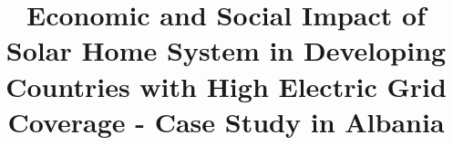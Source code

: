 \documentclass[11pt,oneside,table]{book}
\title{Economic and Social Impact of Solar Home System in Developing Countries with High Electric Grid Coverage - Case Study in Albania}
\begin{document}
\frontmatter
\pagestyle{empty}
\declaration
%


%

\tableofcontents




% 

\mainmatter      %

\pagestyle{fancy}
\fancyhf{} %
\renewcommand{\headrulewidth}{0.6pt} %
\fancyhead[R]{\nouppercase{\leftmark}} %








%






\appendix






\label{Bibliography}



\printbibliography  %
\uisbackcover
\end{document}
